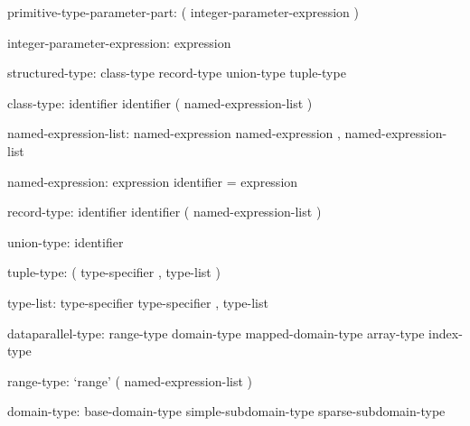 \begin{syntax}
primitive-type-parameter-part:
  ( integer-parameter-expression )
\end{syntax}

\begin{syntax}
integer-parameter-expression:
  expression
\end{syntax}

\begin{syntax}
structured-type:
  class-type
  record-type
  union-type
  tuple-type
\end{syntax}

\begin{syntax}
class-type:
  identifier
  identifier ( named-expression-list )
\end{syntax}

\begin{syntax}
named-expression-list:
  named-expression
  named-expression , named-expression-list
\end{syntax}

\begin{syntax}
named-expression:
  expression
  identifier = expression
\end{syntax}

\begin{syntax}
record-type:
  identifier
  identifier ( named-expression-list )
\end{syntax}

\begin{syntax}
union-type:
  identifier
\end{syntax}

\begin{syntax}
tuple-type:
  ( type-specifier , type-list )
\end{syntax}

\begin{syntax}
type-list:
  type-specifier
  type-specifier , type-list
\end{syntax}

\begin{syntax}
dataparallel-type:
  range-type
  domain-type
  mapped-domain-type
  array-type
  index-type
\end{syntax}

\begin{syntax}
range-type:
  `range' ( named-expression-list )
\end{syntax}

\begin{syntax}
domain-type:
  base-domain-type
  simple-subdomain-type
  sparse-subdomain-type
\end{syntax}

